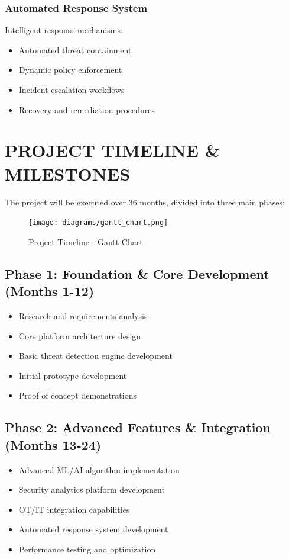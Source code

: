 \documentclass[12pt,a4paper]{article}
\begin{document}
\subsubsection{Automated Response System}
Intelligent response mechanisms:
\begin{itemize}
\item Automated threat containment
\item Dynamic policy enforcement
\item Incident escalation workflows
\item Recovery and remediation procedures
\end{itemize}

\section{PROJECT TIMELINE \& MILESTONES}

The project will be executed over 36 months, divided into three main phases:

\begin{figure}[H]
\centering
\texttt{[image: diagrams/gantt\_chart.png]}
\caption{Project Timeline - Gantt Chart}
\label{fig:timeline}
\end{figure}

\subsection{Phase 1: Foundation \& Core Development (Months 1-12)}
\begin{itemize}
\item Research and requirements analysis
\item Core platform architecture design
\item Basic threat detection engine development
\item Initial prototype development
\item Proof of concept demonstrations
\end{itemize}

\subsection{Phase 2: Advanced Features \& Integration (Months 13-24)}
\begin{itemize}
\item Advanced ML/AI algorithm implementation
\item Security analytics platform development
\item OT/IT integration capabilities
\item Automated response system development
\item Performance testing and optimization
\end{itemize}
\end{document}
